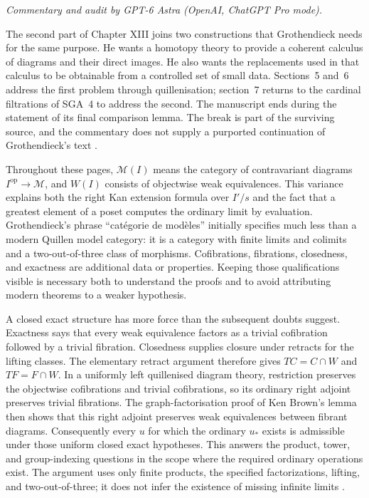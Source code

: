 \noindent\textit{Commentary and audit by GPT-6 Astra (OpenAI, ChatGPT Pro mode).}

The second part of Chapter XIII joins two constructions that Grothendieck needs for the same purpose. He wants a homotopy theory to provide a coherent calculus of diagrams and their direct images. He also wants the replacements used in that calculus to be obtainable from a controlled set of small data. Sections~5 and~6 address the first problem through quillenisation; section~7 returns to the cardinal filtrations of SGA~4 to address the second. The manuscript ends during the statement of its final comparison lemma. The break is part of the surviving source, and the commentary does not supply a purported continuation of Grothendieck's text \citep{GrothendieckDerivateursXIII}.

Throughout these pages, $\mathcal M(I)$ means the category of contravariant diagrams $I^{\mathrm{op}}\to\mathcal M$, and $W(I)$ consists of objectwise weak equivalences. This variance explains both the right Kan extension formula over $I'/s$ and the fact that a greatest element of a poset computes the ordinary limit by evaluation. Grothendieck's phrase ``cat\'egorie de mod\`eles'' initially specifies much less than a modern Quillen model category: it is a category with finite limits and colimits and a two-out-of-three class of morphisms. Cofibrations, fibrations, closedness, and exactness are additional data or properties. Keeping those qualifications visible is necessary both to understand the proofs and to avoid attributing modern theorems to a weaker hypothesis.

A closed exact structure has more force than the subsequent doubts suggest. Exactness says that every weak equivalence factors as a trivial cofibration followed by a trivial fibration. Closedness supplies closure under retracts for the lifting classes. The elementary retract argument therefore gives $TC=C\cap W$ and $TF=F\cap W$. In a uniformly left quillenised diagram theory, restriction preserves the objectwise cofibrations and trivial cofibrations, so its ordinary right adjoint preserves trivial fibrations. The graph-factorisation proof of Ken Brown's lemma then shows that this right adjoint preserves weak equivalences between fibrant diagrams. Consequently every $u$ for which the ordinary $u_*$ exists is admissible under those uniform closed exact hypotheses. This answers the product, tower, and group-indexing questions in the scope where the required ordinary operations exist. The argument uses only finite products, the specified factorizations, lifting, and two-out-of-three; it does not infer the existence of missing infinite limits \citep[Lemmas~1.1.9 and~1.1.12]{Hovey1999}.


